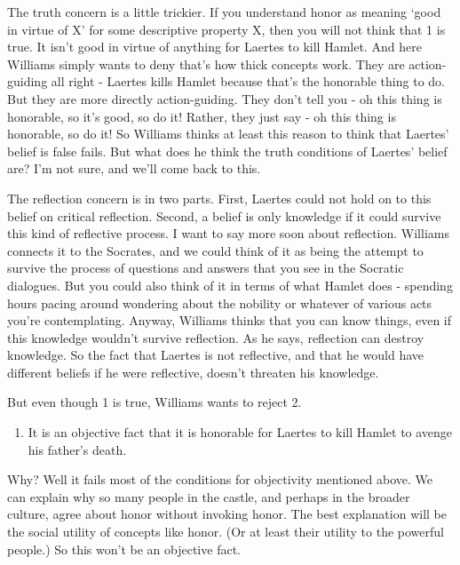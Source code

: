 \documentclass[
]{article}
\providecommand{\tightlist}{%
  \setlength{\itemsep}{0pt}\setlength{\parskip}{0pt}}
\begin{document}
The truth concern is a little trickier. If you understand honor as
meaning `good in virtue of X' for some descriptive property X, then you
will not think that 1 is true. It isn't good in virtue of anything for
Laertes to kill Hamlet. And here Williams simply wants to deny that's
how thick concepts work. They are action-guiding all right - Laertes
kills Hamlet because that's the honorable thing to do. But they are more
directly action-guiding. They don't tell you - oh this thing is
honorable, so it's good, so do it! Rather, they just say - oh this thing
is honorable, so do it! So Williams thinks at least this reason to think
that Laertes' belief is false fails. But what does he think the truth
conditions of Laertes' belief are? I'm not sure, and we'll come back to
this.

The reflection concern is in two parts. First, Laertes could not hold on
to this belief on critical reflection. Second, a belief is only
knowledge if it could survive this kind of reflective process. I want to
say more soon about reflection. Williams connects it to the Socrates,
and we could think of it as being the attempt to survive the process of
questions and answers that you see in the Socratic dialogues. But you
could also think of it in terms of what Hamlet does - spending hours
pacing around wondering about the nobility or whatever of various acts
you're contemplating. Anyway, Williams thinks that you can know things,
even if this knowledge wouldn't survive reflection. As he says,
reflection can destroy knowledge. So the fact that Laertes is not
reflective, and that he would have different beliefs if he were
reflective, doesn't threaten his knowledge.

But even though 1 is true, Williams wants to reject 2.

\begin{enumerate}
\def\labelenumi{\arabic{enumi}.}
\setcounter{enumi}{1}
\tightlist
\item
  It is an objective fact that it is honorable for Laertes to kill
  Hamlet to avenge his father's death.
\end{enumerate}

Why? Well it fails most of the conditions for objectivity mentioned
above. We can explain why so many people in the castle, and perhaps in
the broader culture, agree about honor without invoking honor. The best
explanation will be the social utility of concepts like honor. (Or at
least their utility to the powerful people.) So this won't be an
objective fact.
\end{document}
